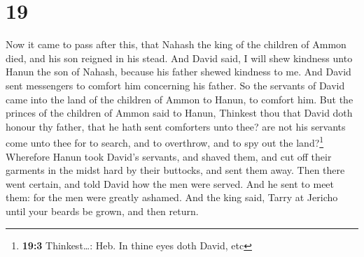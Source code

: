 \hypertarget{section-18}{%
\section{19}\label{section-18}}

 Now it came to pass after this, that Nahash the king of
the children of Ammon died, and his son reigned in his stead.
 And David said, I will shew kindness unto Hanun the son
of Nahash, because his father shewed kindness to me. And David sent
messengers to comfort him concerning his father. So the servants of
David came into the land of the children of Ammon to Hanun, to comfort
him.  But the princes of the children of Ammon said to
Hanun, Thinkest thou that David doth honour thy father, that he hath
sent comforters unto thee? are not his servants come unto thee for to
search, and to overthrow, and to spy out the land?\footnote{\textbf{19:3}
  Thinkest\ldots: Heb. In thine eyes doth David, etc} 
Wherefore Hanun took David's servants, and shaved them, and cut off
their garments in the midst hard by their buttocks, and sent them away.
 Then there went certain, and told David how the men were
served. And he sent to meet them: for the men were greatly ashamed. And
the king said, Tarry at Jericho until your beards be grown, and then
return.

